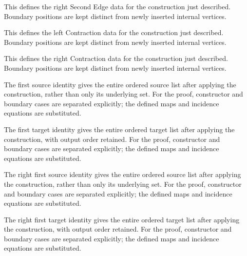 This defines the right Second Edge data for the construction just described. Boundary positions are kept distinct from newly inserted internal vertices.
\par{}

This defines the left Contraction data for the construction just described. Boundary positions are kept distinct from newly inserted internal vertices.
\par{}

This defines the right Contraction data for the construction just described. Boundary positions are kept distinct from newly inserted internal vertices.
\par{}

The first source identity gives the entire ordered source list after applying the construction, rather than only its underlying set.
For the proof, constructor and boundary cases are separated explicitly; the defined maps and incidence equations are substituted.
\par{}

The first target identity gives the entire ordered target list after applying the construction, with output order retained.
For the proof, constructor and boundary cases are separated explicitly; the defined maps and incidence equations are substituted.
\par{}

The right first source identity gives the entire ordered source list after applying the construction, rather than only its underlying set.
For the proof, constructor and boundary cases are separated explicitly; the defined maps and incidence equations are substituted.
\par{}

The right first target identity gives the entire ordered target list after applying the construction, with output order retained.
For the proof, constructor and boundary cases are separated explicitly; the defined maps and incidence equations are substituted.
\par{}

